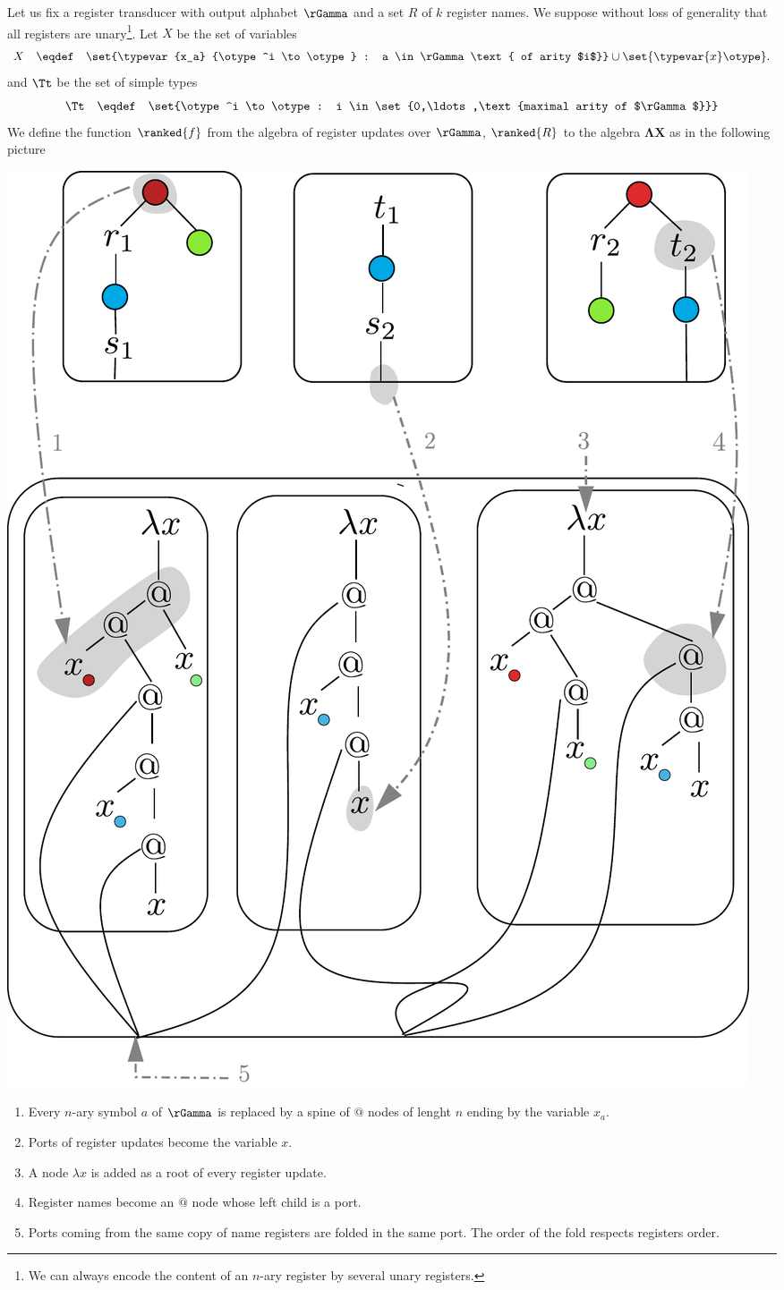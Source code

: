 Let us fix a register transducer with output alphabet $\rGamma$ and a set $R$ of $k$ register names. 
We suppose without loss of generality that all registers are unary\footnote{We can always encode the content of an $n$-ary register by several unary registers.}. Let $X$ be the set of variables 
\begin{align*}
X  \quad \eqdef \quad \set{\typevar {x_a} {\otype^i \to \otype} : a \in \rGamma \text{ of arity $i$}} \cup \set{\typevar {x} \otype}.
\end{align*}
and $\Tt$ be the set of simple types 
\begin{align*}
    \Tt \quad \eqdef \quad \set{\otype^i \to \otype : i \in \set{0,\ldots,\text{maximal arity of $\rGamma$}}}
\end{align*}
We define the function $\ranked{f}$ from the algebra of register updates over $\rGamma$, $\ranked{R}$ to  the algebra $\mathbf{\Lambda X}$ as in the following picture
\begin{center}
\includegraphics[scale=.4]{embedding.pdf}
\end{center}
\begin{enumerate}
\item Every $n$-ary symbol $a$ of $\rGamma$ is replaced by a spine of $@$ nodes of lenght $n$ ending by the variable $x_a$.
\item Ports of register updates become the variable $x$.
\item A node $\lambda x$ is added as a root of every register update.
\item Register names become an $@$ node whose left child is a port. 
\item Ports coming from the same copy of name registers are folded in the same port. The order of the fold respects registers order.
\end{enumerate}
